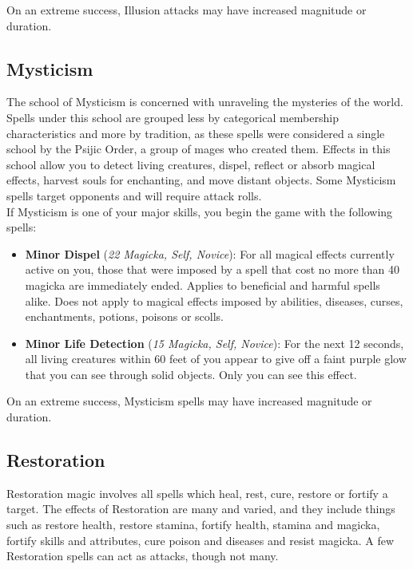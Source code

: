 On an extreme success, Illusion attacks may have increased magnitude or duration.

\subsection{Mysticism}
The school of Mysticism is concerned with unraveling the mysteries of the world. Spells under this school are grouped less by categorical membership characteristics and more by tradition, as these spells were considered a single school by the Psijic Order, a group of mages who created them. Effects in this school allow you to detect living creatures, dispel, reflect or absorb magical effects, harvest souls for enchanting, and move distant objects. Some Mysticism spells target opponents and will require attack rolls.\\

If Mysticism is one of your major skills, you begin the game with the following spells:
\begin{itemize}
	\item \textbf{Minor Dispel} (\textit{22 Magicka, Self, Novice}): For all magical effects currently active on you, those that were imposed by a spell that cost no more than 40 magicka are immediately ended. Applies to beneficial and harmful spells alike. Does not apply to magical effects imposed by abilities, diseases, curses, enchantments, potions, poisons or scolls.
	\item \textbf{Minor Life Detection} (\textit{15 Magicka, Self, Novice}): For the next 12 seconds, all living creatures within 60 feet of you appear to give off a faint purple glow that you can see through solid objects. Only you can see this effect.
\end{itemize}

On an extreme success, Mysticism spells may have increased magnitude or duration.

\subsection{Restoration}
Restoration magic involves all spells which heal, rest, cure, restore or fortify a target. The effects of Restoration are many and varied, and they include things such as restore health, restore stamina, fortify health, stamina and magicka, fortify skills and attributes, cure poison and diseases and resist magicka. A few Restoration spells can act as attacks, though not many.\\


